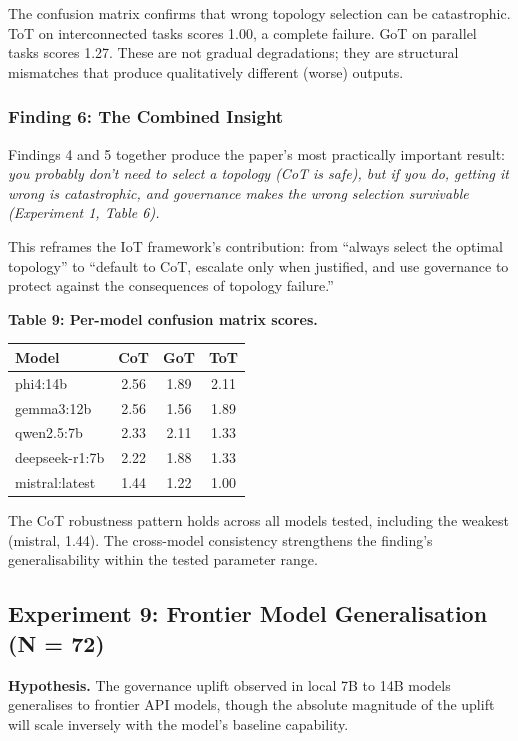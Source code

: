 \documentclass[11pt,a4paper]{article}
\begin{document}
The confusion matrix confirms that wrong topology selection can be
catastrophic. ToT on interconnected tasks scores 1.00, a complete
failure. GoT on parallel tasks scores 1.27. These are not gradual
degradations; they are structural mismatches that produce qualitatively
different (worse) outputs.

\subsubsection{Finding 6: The Combined
Insight}\label{finding-6-the-combined-insight}

Findings 4 and 5 together produce the paper's most practically important
result: \emph{you probably don't need to select a topology (CoT is
safe), but if you do, getting it wrong is catastrophic, and governance
makes the wrong selection survivable (Experiment 1, Table 6).}

This reframes the IoT framework's contribution: from ``always select the
optimal topology'' to ``default to CoT, escalate only when justified,
and use governance to protect against the consequences of topology
failure.''

\textbf{Table 9: Per-model confusion matrix scores.}

{\small\begin{longtable}[]{@{}lccc@{}}
\toprule\noalign{}
Model & CoT & GoT & ToT \\
\midrule\noalign{}
\endhead
\bottomrule\noalign{}
\endlastfoot
phi4:14b & 2.56 & 1.89 & 2.11 \\
gemma3:12b & 2.56 & 1.56 & 1.89 \\
qwen2.5:7b & 2.33 & 2.11 & 1.33 \\
deepseek-r1:7b & 2.22 & 1.88 & 1.33 \\
mistral:latest & 1.44 & 1.22 & 1.00 \\
\end{longtable}}

The CoT robustness pattern holds across all models tested, including the
weakest (mistral, 1.44). The cross-model consistency strengthens the
finding's generalisability within the tested parameter range.

\subsection{Experiment 9: Frontier Model Generalisation (N =
72)}\label{experiment-9-frontier-model-generalisation-n-72}

\textbf{Hypothesis.} The governance uplift observed in local 7B to 14B
models generalises to frontier API models, though the absolute magnitude
of the uplift will scale inversely with the model's baseline capability.
\end{document}
